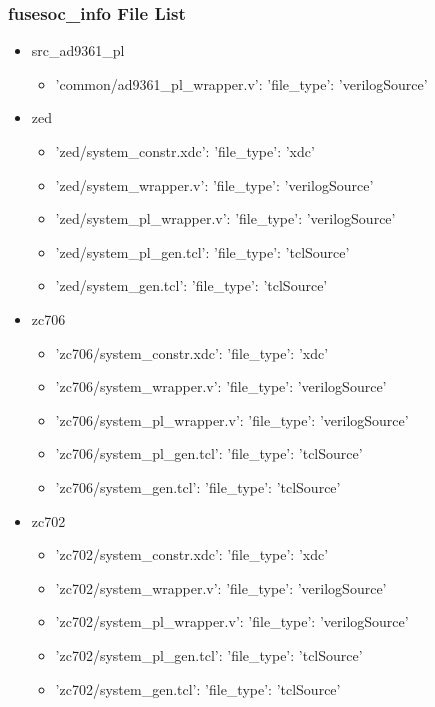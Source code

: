 \subsubsection{fusesoc\_info File List}
\begin{itemize}
\item src\_ad9361\_pl
	\begin{itemize}
	\item {'common/ad9361\_pl\_wrapper.v': {'file\_type': 'verilogSource'}}
	\end{itemize}
\item zed
	\begin{itemize}
	\item {'zed/system\_constr.xdc': {'file\_type': 'xdc'}}
	\item {'zed/system\_wrapper.v': {'file\_type': 'verilogSource'}}
	\item {'zed/system\_pl\_wrapper.v': {'file\_type': 'verilogSource'}}
	\item {'zed/system\_pl\_gen.tcl': {'file\_type': 'tclSource'}}
	\item {'zed/system\_gen.tcl': {'file\_type': 'tclSource'}}
	\end{itemize}
\item zc706
	\begin{itemize}
	\item {'zc706/system\_constr.xdc': {'file\_type': 'xdc'}}
	\item {'zc706/system\_wrapper.v': {'file\_type': 'verilogSource'}}
	\item {'zc706/system\_pl\_wrapper.v': {'file\_type': 'verilogSource'}}
	\item {'zc706/system\_pl\_gen.tcl': {'file\_type': 'tclSource'}}
	\item {'zc706/system\_gen.tcl': {'file\_type': 'tclSource'}}
	\end{itemize}
\item zc702
	\begin{itemize}
	\item {'zc702/system\_constr.xdc': {'file\_type': 'xdc'}}
	\item {'zc702/system\_wrapper.v': {'file\_type': 'verilogSource'}}
	\item {'zc702/system\_pl\_wrapper.v': {'file\_type': 'verilogSource'}}
	\item {'zc702/system\_pl\_gen.tcl': {'file\_type': 'tclSource'}}
	\item {'zc702/system\_gen.tcl': {'file\_type': 'tclSource'}}
	\end{itemize}

\end{itemize}
